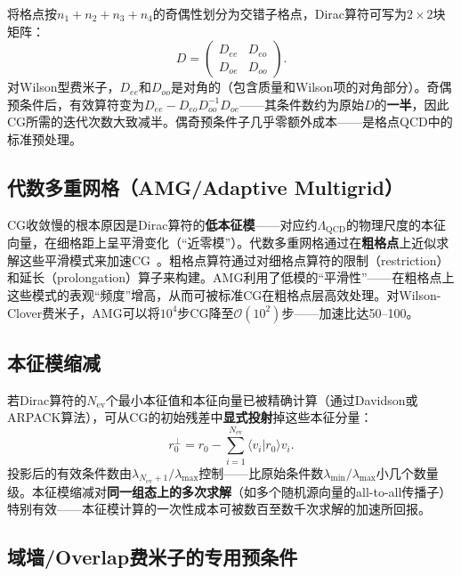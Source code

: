 \documentclass[12pt,a4paper]{ctexart}
\theoremstyle{definition}
\begin{document}
将格点按$n_1+n_2+n_3+n_4$的奇偶性划分为交错子格点，Dirac算符可写为$2\times 2$块矩阵：
\begin{equation}
D = \begin{pmatrix} D_{ee} & D_{eo} \\ D_{oe} & D_{oo} \end{pmatrix}.
\label{eq:even_odd_precond}
\end{equation}
对Wilson型费米子，$D_{ee}$和$D_{oo}$是对角的（包含质量和Wilson项的对角部分）。奇偶预条件后，有效算符变为$D_{ee} - D_{eo} D_{oo}^{-1} D_{oe}$——其条件数约为原始$D$的\textbf{一半}，因此CG所需的迭代次数大致减半。偶奇预条件子几乎零额外成本——是格点QCD中的标准预处理。

\subsection{代数多重网格（AMG/Adaptive Multigrid）}

CG收敛慢的根本原因是Dirac算符的\textbf{低本征模}——对应约$\Lambda_{\text{QCD}}$的物理尺度的本征向量，在细格距上呈平滑变化（``近零模''）。代数多重网格通过在\textbf{粗格点}上近似求解这些平滑模式来加速CG~\cite{GattringerLang2010}。粗格点算符通过对细格点算符的限制（restriction）和延长（prolongation）算子来构建。AMG利用了低模的``平滑性''——在粗格点上这些模式的表观``频度''增高，从而可被标准CG在粗格点层高效处理。对Wilson-Clover费米子，AMG可以将$10^4$步CG降至$\mathcal{O}(10^2)$步——加速比达50--100。

\subsection{本征模缩减}

若Dirac算符的$N_{\text{ev}}$个最小本征值和本征向量已被精确计算（通过Davidson或ARPACK算法），可从CG的初始残差中\textbf{显式投射}掉这些本征分量：
\begin{equation}
r_0^{\perp} = r_0 - \sum_{i=1}^{N_{\text{ev}}} \langle v_i | r_0 \rangle v_i.
\label{eq:deflation}
\end{equation}
投影后的有效条件数由$\lambda_{N_{\text{ev}}+1}/\lambda_{\max}$控制——比原始条件数$\lambda_{\min}/\lambda_{\max}$小几个数量级。本征模缩减对\textbf{同一组态上的多次求解}（如多个随机源向量的all-to-all传播子）特别有效——本征模计算的一次性成本可被数百至数千次求解的加速所回报。

\subsection{域墙/Overlap费米子的专用预条件}
\end{document}

